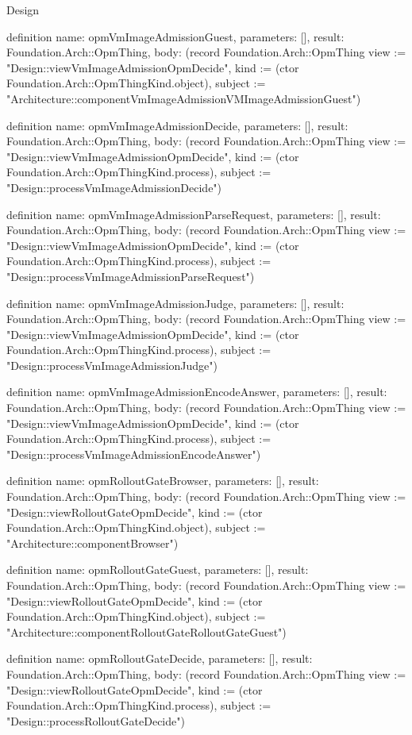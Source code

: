 \begin{lexlean}{Design}
\begin{semanticmodule}
definition{
  name: opmVmImageAdmissionGuest,
  parameters: [],
  result: Foundation.Arch::OpmThing,
  body: (record Foundation.Arch::OpmThing {view := "Design::viewVmImageAdmissionOpmDecide", kind := (ctor Foundation.Arch::OpmThingKind.object), subject := "Architecture::componentVmImageAdmissionVMImageAdmissionGuest"})
}

definition{
  name: opmVmImageAdmissionDecide,
  parameters: [],
  result: Foundation.Arch::OpmThing,
  body: (record Foundation.Arch::OpmThing {view := "Design::viewVmImageAdmissionOpmDecide", kind := (ctor Foundation.Arch::OpmThingKind.process), subject := "Design::processVmImageAdmissionDecide"})
}

definition{
  name: opmVmImageAdmissionParseRequest,
  parameters: [],
  result: Foundation.Arch::OpmThing,
  body: (record Foundation.Arch::OpmThing {view := "Design::viewVmImageAdmissionOpmDecide", kind := (ctor Foundation.Arch::OpmThingKind.process), subject := "Design::processVmImageAdmissionParseRequest"})
}

definition{
  name: opmVmImageAdmissionJudge,
  parameters: [],
  result: Foundation.Arch::OpmThing,
  body: (record Foundation.Arch::OpmThing {view := "Design::viewVmImageAdmissionOpmDecide", kind := (ctor Foundation.Arch::OpmThingKind.process), subject := "Design::processVmImageAdmissionJudge"})
}

definition{
  name: opmVmImageAdmissionEncodeAnswer,
  parameters: [],
  result: Foundation.Arch::OpmThing,
  body: (record Foundation.Arch::OpmThing {view := "Design::viewVmImageAdmissionOpmDecide", kind := (ctor Foundation.Arch::OpmThingKind.process), subject := "Design::processVmImageAdmissionEncodeAnswer"})
}

definition{
  name: opmRolloutGateBrowser,
  parameters: [],
  result: Foundation.Arch::OpmThing,
  body: (record Foundation.Arch::OpmThing {view := "Design::viewRolloutGateOpmDecide", kind := (ctor Foundation.Arch::OpmThingKind.object), subject := "Architecture::componentBrowser"})
}

definition{
  name: opmRolloutGateGuest,
  parameters: [],
  result: Foundation.Arch::OpmThing,
  body: (record Foundation.Arch::OpmThing {view := "Design::viewRolloutGateOpmDecide", kind := (ctor Foundation.Arch::OpmThingKind.object), subject := "Architecture::componentRolloutGateRolloutGateGuest"})
}

definition{
  name: opmRolloutGateDecide,
  parameters: [],
  result: Foundation.Arch::OpmThing,
  body: (record Foundation.Arch::OpmThing {view := "Design::viewRolloutGateOpmDecide", kind := (ctor Foundation.Arch::OpmThingKind.process), subject := "Design::processRolloutGateDecide"})
}


\end{semanticmodule}
\end{lexlean}
